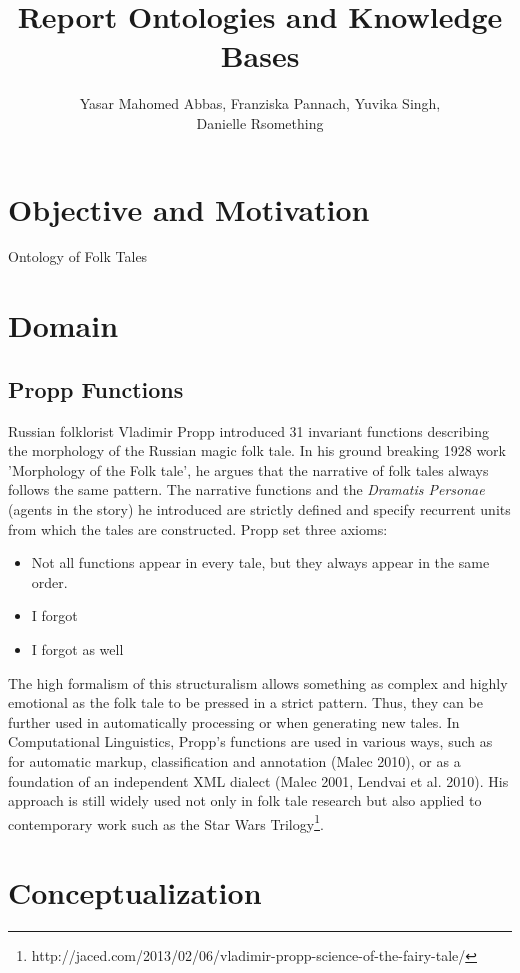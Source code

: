 \documentclass[10pt,a4paper]{article}
\author{Yasar Mahomed Abbas, Franziska Pannach, Yuvika Singh, \\Danielle Rsomething}
\title{Report Ontologies and Knowledge Bases}
\begin{document}
\maketitle


\section{Objective and Motivation}
Ontology of Folk Tales 
\section{Domain}
	\subsection{Propp Functions} 
	Russian folklorist Vladimir Propp introduced 31 invariant functions describing the morphology of the Russian magic folk tale. In his ground breaking 1928 work 'Morphology of the Folk tale', he argues that the narrative of folk tales always follows the same pattern. The narrative functions and the \textit{Dramatis Personae} (agents in the story) he introduced are strictly defined and specify recurrent units from which the tales are constructed. 
	Propp set three axioms: 
	
	\begin{itemize}
		\item Not all functions appear in every tale, but they always appear in the same order. 
		\item 	I forgot
		
		\item I forgot as well 
	
	\end{itemize}
The high formalism of this structuralism allows something as complex and highly emotional as the folk tale to be pressed in a strict pattern. Thus, they can be further used in automatically processing or when generating new tales. In Computational Linguistics, Propp's functions are used in various ways, such as for automatic markup, classification and annotation (Malec 2010), or as a foundation of an independent XML dialect (Malec 2001,  Lendvai et al. 2010). 
	His approach is still widely used not only in folk tale research but also applied to contemporary work such as the Star Wars Trilogy\footnote{http://jaced.com/2013/02/06/vladimir-propp-science-of-the-fairy-tale/}.   

\section{Conceptualization}
\end{document}
